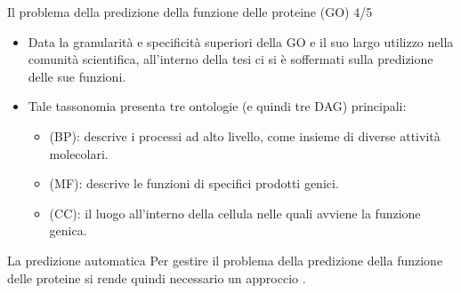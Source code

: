 \documentclass{beamer}
\begin{document}
\begin{tframe}{\small Il problema della predizione della funzione delle proteine (GO) 4/5}
\begin{itemize}
\item Data la granularità e specificità superiori della GO e il suo largo utilizzo nella comunità scientifica, all’interno della tesi ci si è soffermati sulla predizione delle sue funzioni.
\item Tale tassonomia presenta tre ontologie (e quindi tre DAG) principali:
\begin{itemize}
\item {} (BP): descrive i processi ad alto livello, come insieme di diverse attività molecolari.
\item {} (MF): descrive le funzioni di specifici prodotti genici.
\item {} (CC): il luogo all’interno della cellula nelle quali avviene la funzione genica.
\end{itemize}
\end{itemize}  

\end{tframe}

\begin{tframe}{La predizione automatica}
Per gestire il problema della predizione della funzione delle proteine si rende quindi necessario un approccio .

\end{tframe}
\end{document}
